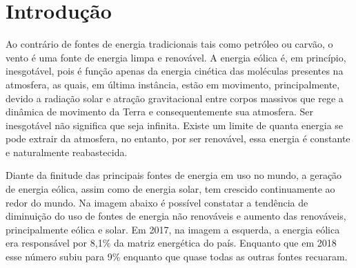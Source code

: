 \documentclass[
	12pt,				%
	openright,			%
	oneside,			%
	a4paper,			%
	english,			%
	french,				%
	spanish,			%
	brazil				%
	]{abntex2}
\begin{document}
\chapter*[Introdução]{Introdução}



Ao contrário de fontes de energia tradicionais tais como petróleo ou carvão, o vento é uma fonte de energia limpa e renovável. A energia eólica é, em princípio, inesgotável, pois é função apenas da energia cinética das moléculas presentes na atmosfera, as quais, em última instância, estão em movimento, principalmente, devido a radiação solar e atração gravitacional entre corpos massivos que rege a dinâmica de movimento da Terra e consequentemente sua atmosfera. Ser inesgotável não significa que seja infinita. Existe um limite de quanta energia se pode extrair da atmosfera, no entanto, por ser renovável, essa energia é constante e naturalmente reabastecida.

Diante da finitude das principais fontes de energia em uso no mundo, a geração de energia eólica, assim como de energia solar, tem crescido continuamente ao redor do mundo. Na imagem abaixo é possível constatar a tendência de diminuição do uso de fontes de energia não renováveis e aumento das renováveis, principalmente eólica e solar. Em 2017, na imagem a esquerda, a energia eólica era responsável por 8,1\% da matriz energética do país. Enquanto que em 2018 esse número subiu para 9\% enquanto que quase todas as outras fontes recuaram.
\end{document}
